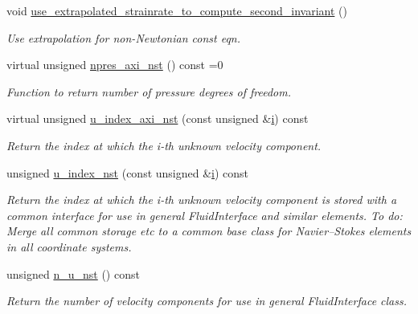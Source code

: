 \begin{DoxyCompactItemize}
void \hyperlink{classoomph_1_1GeneralisedNewtonianAxisymmetricNavierStokesEquations_add8cfa44527e5c77fadffc0654738cda}{use\+\_\+extrapolated\+\_\+strainrate\+\_\+to\+\_\+compute\+\_\+second\+\_\+invariant} ()
\begin{DoxyCompactList}\small\item\em Use extrapolation for non-\/\+Newtonian const eqn. \end{DoxyCompactList}\item 
virtual unsigned \hyperlink{classoomph_1_1GeneralisedNewtonianAxisymmetricNavierStokesEquations_a4c4c6c5ae937187b735e79451a0befbc}{npres\+\_\+axi\+\_\+nst} () const =0
\begin{DoxyCompactList}\small\item\em Function to return number of pressure degrees of freedom. \end{DoxyCompactList}\item 
virtual unsigned \hyperlink{classoomph_1_1GeneralisedNewtonianAxisymmetricNavierStokesEquations_a13fccddff4fd22e3c16b20a5a2227f6d}{u\+\_\+index\+\_\+axi\+\_\+nst} (const unsigned \&\hyperlink{cfortran_8h_adb50e893b86b3e55e751a42eab3cba82}{i}) const
\begin{DoxyCompactList}\small\item\em Return the index at which the i-\/th unknown velocity component. \end{DoxyCompactList}\item 
unsigned \hyperlink{classoomph_1_1GeneralisedNewtonianAxisymmetricNavierStokesEquations_a00a6315cdffc1f3613711859f74146aa}{u\+\_\+index\+\_\+nst} (const unsigned \&\hyperlink{cfortran_8h_adb50e893b86b3e55e751a42eab3cba82}{i}) const
\begin{DoxyCompactList}\small\item\em Return the index at which the i-\/th unknown velocity component is stored with a common interface for use in general Fluid\+Interface and similar elements. To do\+: Merge all common storage etc to a common base class for Navier--Stokes elements in all coordinate systems. \end{DoxyCompactList}\item 
unsigned \hyperlink{classoomph_1_1GeneralisedNewtonianAxisymmetricNavierStokesEquations_a2fab3fc070cd9506f16e7d775f380346}{n\+\_\+u\+\_\+nst} () const
\begin{DoxyCompactList}\small\item\em Return the number of velocity components for use in general Fluid\+Interface class. \end{DoxyCompactList}\item 

\end{DoxyCompactItemize}
